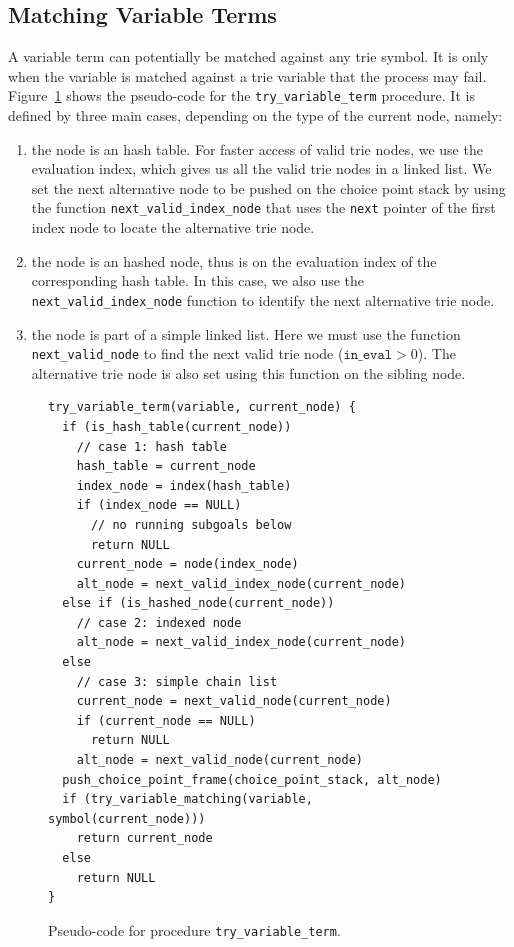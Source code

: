 \subsection{Matching Variable Terms}

A variable term can potentially be matched against any trie symbol. It
is only when the variable is matched against a trie variable that the
process may fail. Figure~\ref{fig:try_variable_term} shows the
pseudo-code for the \texttt{try\_variable\_term} procedure. It is defined
by three main cases, depending on the type of the current node, namely:

\begin{enumerate}
\item the node is an hash table. For faster access of valid trie  nodes, we use the evaluation index, which gives us all the valid
  trie nodes in a linked list. We set the next alternative node to be  pushed on the choice point stack by using the function
  \texttt{next\_valid\_index\_node} that uses the \texttt{next} pointer of the  first index node to locate the alternative trie node.
\item the node is an hashed node, thus is on the evaluation index of  the corresponding hash table. In this case, we also use the
  \texttt{next\_valid\_index\_node} function to identify the next
  alternative trie node.\item the node is part of a simple linked list. Here we must use the
  function \texttt{next\_valid\_node} to find the next valid trie node
  ($\texttt{in\_eval} > 0$). The alternative trie node is also set using this
  function on the sibling node.
\end{enumerate}

\begin{figure}[ht]
\begin{Verbatim}
try_variable_term(variable, current_node) {
  if (is_hash_table(current_node))
    // case 1: hash table
    hash_table = current_node
    index_node = index(hash_table)    
    if (index_node == NULL)
      // no running subgoals below
      return NULL    
    current_node = node(index_node)
    alt_node = next_valid_index_node(current_node)
  else if (is_hashed_node(current_node))
    // case 2: indexed node
    alt_node = next_valid_index_node(current_node)
  else
    // case 3: simple chain list
    current_node = next_valid_node(current_node)
    if (current_node == NULL)
      return NULL
    alt_node = next_valid_node(current_node)
  push_choice_point_frame(choice_point_stack, alt_node)
  if (try_variable_matching(variable, symbol(current_node)))
    return current_node
  else
    return NULL
}
\end{Verbatim}
\caption{Pseudo-code for procedure \texttt{try\_variable\_term}.}
\label{fig:try_variable_term}
\end{figure}

